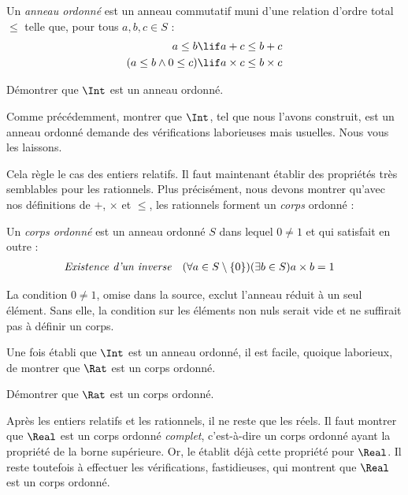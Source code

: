 \documentclass[11pt,a4paper,openany]{memoir}
\begin{document}
\begin{defn}
Un \emph{anneau ordonné} est un anneau commutatif muni d'une relation
d'ordre total $\leq$ telle que, pour tous $a,b,c\in S$ :
\begin{align*}
  a \leq b &\lif a + c \leq b + c\\
  (a \leq b \land 0 \leq c) &\lif a \times c \leq b \times c
\end{align*}
\end{defn}

\begin{prob}
Démontrer que $\Int$ est un anneau ordonné.
\end{prob}

Comme précédemment, montrer que $\Int$, tel que nous l'avons construit,
est un anneau ordonné demande des vérifications laborieuses mais
usuelles. Nous vous les laissons.

Cela règle le cas des entiers relatifs. Il faut maintenant établir des
propriétés très semblables pour les rationnels. Plus précisément, nous
devons montrer qu'avec nos définitions de $+$, $\times$ et $\leq$, les
rationnels forment un \emph{corps} ordonné :
\begin{defn}
Un \emph{corps ordonné} est un anneau ordonné $S$ dans lequel
$0\neq1$ et qui satisfait en outre :
\begin{align*}
  \emph{Existence d'un inverse}& &
  (\forall a \in S \setminus \{0\})(\exists b \in S) a\times b& = 1
\end{align*}
\end{defn}
\begin{editorial}
La condition $0\neq1$, omise dans la source, exclut l'anneau réduit à un
seul élément. Sans elle, la condition sur les éléments non nuls serait
vide et ne suffirait pas à définir un corps.
\end{editorial}

Une fois établi que $\Int$ est un anneau ordonné, il est facile, quoique
laborieux, de montrer que $\Rat$ est un corps ordonné.

\begin{prob}
Démontrer que $\Rat$ est un corps ordonné.
\end{prob}

Après les entiers relatifs et les rationnels, il ne reste que les réels.
Il faut montrer que $\Real$ est un corps ordonné \emph{complet},
c'est-à-dire un corps ordonné ayant la propriété de la borne supérieure.
Or, le  établit déjà cette propriété pour
$\Real$. Il reste toutefois à effectuer les vérifications, fastidieuses,
qui montrent que $\Real$ est un corps ordonné.
\end{document}
